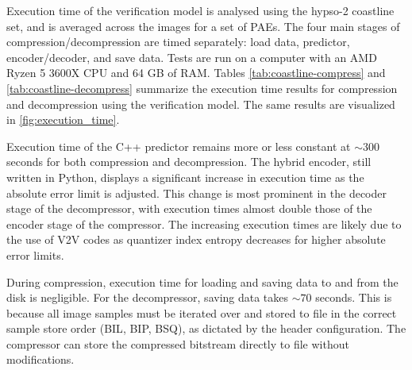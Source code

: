 Execution time of the verification model is analysed using the \acrshort{hypso}-2 coastline set, and is averaged across the images for a set of \acrshort{PAE}s. The four main stages of compression/decompression are timed separately: load data, predictor, encoder/decoder, and save data. Tests are run on a computer with an AMD Ryzen 5 3600X CPU and 64 GB of RAM. Tables \ref{tab:coastline-compress} and \ref{tab:coastline-decompress} summarize the execution time results for compression and decompression using the verification model. The same results are visualized in \autoref{fig:execution_time}.

Execution time of the C++ predictor remains more or less constant at $\sim300$ seconds for both compression and decompression. The hybrid encoder, still written in Python, displays a significant increase in execution time as the absolute error limit is adjusted. This change is most prominent in the decoder stage of the decompressor, with execution times almost double those of the encoder stage of the compressor. The increasing execution times are likely due to the use of \acrshort{V2V} codes as quantizer index entropy decreases for higher absolute error limits.

During compression, execution time for loading and saving data to and from the disk is negligible. For the decompressor, saving data takes $\sim70$ seconds. This is because all image samples must be iterated over and stored to file in the correct sample store order (\acrshort{BIL}, \acrshort{BIP}, \acrshort{BSQ}), as dictated by the header configuration. The compressor can store the compressed bitstream directly to file without modifications.

